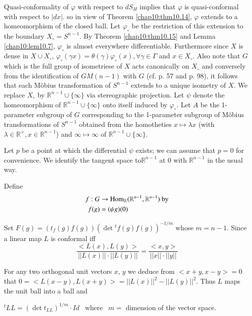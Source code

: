 Quasi-conformality of $\varphi$ with respect to $dS_H$ implies that
$\varphi$ is quasi-conformal with respect to $|dx|$. so in view of
Theorem \ref{chap10:thm10.14}, $\varphi$ extends to a homeomorphism of
the closed ball. Let $\varphi_\circ$ be the restriction of this
extension to the boundary $X_\circ= S^{n-1}$. By Theorem
\ref{chap10:thm10.15} and Lemma \ref{chap10:lem10.7}, $\varphi_\circ$
is almost everywhere differentiable. Furthermore since $X$ is dense
in $X \cup X_\circ$, $\varphi_\circ(\gamma x)= \theta(\gamma)
\varphi_\circ (x), \forall \gamma \in \Gamma$ and $x \in
X_\circ$. Also note that $G$ which is the full group of isometriese of
$X$ acts canonically on $X_\circ$ and conversely from the
identification of $GM(n-1)$ with $G$ (cf. \cite{17} p. 57 and p. 98),
it follows that each M\"obius transformation of $S^{n-1}$ extends to a
unique isometry of $X$. We replace $X_\circ$ by $\mathbb{R}^{n-1}\cup
\{ \infty\}$ via stereographic projection. Let $\psi$ denote the
homeomorphism of $\mathbb{R}^{n-1} \cup \{ \infty\}$ onto itself
induced by $\varphi_\circ$. Let $A$ be the 1-parameter subgroup of $G$
corresponding to the 1-parameter subgroup of M\"obius transformations
of $S^{n-1}$ obtained from the homotheties $x \mapsto \lambda x$ (with
$\lambda \in \mathbb{R}^+, x \in \mathbb{R}^{n-1}$) and $\infty
\mapsto \infty$ of $\mathbb{R}^{n-1} \cup \{ \infty\}$.

Let $p$ be a point at which the differential $\psi$ exists; we can
assume that $p=0$ for convenience. We identify the tangent space
to\pageoriginale $\mathbb{R}^{n-1}$ at 0 with $\mathbb{R}^{n-1}$ in
the usual way.

Define 
\begin{align*}
  f:G & \to \operatorname{Hom}_\mathbb{R} (\mathbb{R}^{n-1}, \mathbb{R}^{n-1})
  ~\text{by}\\
  f(g) & = (\psi g) (0)
\end{align*}

Set $F(g)= (t_f(g) f(g)) (\det {}^t f(g) f(g))^{-1/m}$ whose
$m=n-1$. Since a linear map $L$ is conformal iff 
$$
\frac{<L(x), L(y)>}{||L(x)|| \cdot || L(y)||} = \frac{<x, y>}{||x||
  \cdot ||y||}
$$

For any two orthogonal unit vectors $x$, $y$ we deduce from $<x+y,
x-y>=0$ that $0 = <L (x-y), L (x+y)>= || L(x) ||^2 - ||
L(y)||^2$. Thus $L$ maps the unit ball into a ball and 
\begin{center}
  ${}^t LL = (\det t_{LL})^{1/m} \cdot Id $ ~where~ $m=$ dimension of
  the vector space.
\end{center}

